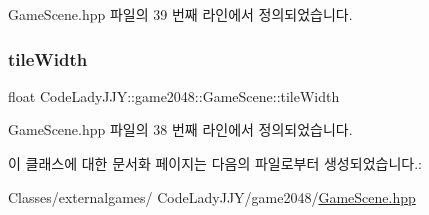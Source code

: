 Game\+Scene.\+hpp 파일의 39 번째 라인에서 정의되었습니다.

\mbox{\label{class_code_lady_j_j_y_1_1game2048_1_1_game_scene_ab307f78ad0015cd32b2c71483fcb3cc5}} 
\subsubsection{\texorpdfstring{tile\+Width}{tileWidth}}
{\footnotesize\ttfamily float Code\+Lady\+J\+J\+Y\+::game2048\+::\+Game\+Scene\+::tile\+Width\hspace{0.3cm}{\ttfamily [private]}}



Game\+Scene.\+hpp 파일의 38 번째 라인에서 정의되었습니다.



이 클래스에 대한 문서화 페이지는 다음의 파일로부터 생성되었습니다.\+:\begin{DoxyCompactItemize}
\item 
Classes/externalgames/ Code\+Lady\+J\+J\+Y/game2048/\hyperlink{_game_scene_8hpp}{Game\+Scene.\+hpp}\end{DoxyCompactItemize}
